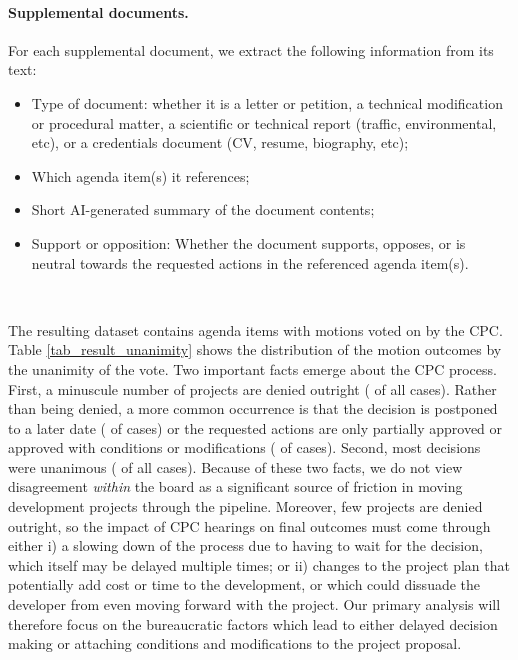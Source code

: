 \paragraph{Supplemental documents.} For each supplemental document, we extract the following information from its text:
\begin{itemize}[noitemsep, topsep=0pt]
\item Type of document: whether it is a letter or petition, a technical modification or procedural matter, a scientific or technical report (traffic, environmental, etc), or a credentials document (CV, resume, biography, etc); 
\item Which agenda item(s) it references;
\item Short AI-generated summary of the document contents;
\item Support or opposition: Whether the document supports, opposes, or is neutral towards the requested actions in the referenced agenda item(s).
\end{itemize}

~

\noindent The resulting dataset contains  agenda items with motions voted on by the CPC. Table \ref{tab_result_unanimity} shows the distribution of the motion outcomes by the unanimity of the vote. Two important facts emerge about the CPC process. First, a minuscule number of projects are denied outright ( of all cases). Rather than being denied, a more common occurrence is that the decision is postponed to a later date ( of cases) or the requested actions are only partially approved or approved with conditions or modifications ( of cases). Second, most decisions were unanimous ( of all cases). Because of these two facts, we do not view disagreement \emph{within} the board as a significant source of friction in moving development projects through the pipeline. Moreover, few projects are denied outright, so the impact of CPC hearings on final outcomes must come through either i) a slowing down of the process due to having to wait for the decision, which itself may be delayed multiple times; or ii) changes to the project plan that potentially add cost or time to the development, or which could  dissuade the developer from even moving forward with the project. Our primary analysis will therefore focus on the bureaucratic factors which lead to either delayed decision making or attaching conditions and modifications to the project proposal.


